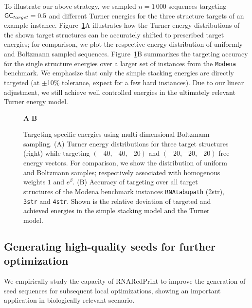 \documentclass{bioinfo}
\makeatletter
\newlength{\@aligneps}
\newcommand{\includegraphicstop}[2][]{%
\sbox{\@alignepsbox}{\texttt{[image: \#2]}}%
\setlength{\@aligneps}{-\ht\@alignepsbox}%
\addtolength{\@aligneps}{2ex}%
\raisebox{\@aligneps}{\usebox{\@alignepsbox}}}
\newcommand{\Software}[1]{{\ttfamily #1}}
\newcommand{\ourprog}{\Software{RNARedPrint}}
\makeatother
\begin{document}
To illustrate our above strategy, we sampled $n=1\,000$ sequences
targeting ${\sf GC}_{target}=0.5$ and different Turner energies for
the three structure targets of an example
instance. Figure~\ref{fig:energydist}A illustrates how the Turner
energy distributions of the shown target structures can be accurately
shifted to prescribed target energies; for comparison, we plot the
respective energy distribution of uniformly and Boltzmann sampled
sequences. Figure~\ref{fig:energydist}B summarizes the targeting accuracy for the single structure energies over a larger set of instances
from the \texttt{Modena} benchmark. We emphasize that only the simple stacking energies
are directly targeted (at $\pm$10\% tolerance, expect for a few hard
instances). Due to our linear adjustment, we still achieve well
controlled energies in the ultimately relevant Turner energy model.
\begin{figure}[t]
  \begin{center}
    {\sf \bfseries A}\includegraphicstop[width=0.57\textwidth]{Figs/energy_distribution}
    {\sf \bfseries B}\includegraphicstop[width=0.32\textwidth]{Figs/offset}
  \end{center}
  \caption{%
  	Targeting specific energies using multi-dimensional Boltzmann sampling. (A) Turner energy distributions for three target structures (right) while targeting $(-40,-40,-20)$ and $(-20,-20,-20)$ free energy vectors. For comparison, we show the distribution of uniform and Boltzmann samples; respectively associated with homogenous weights $1$ and $e^\beta$. (B) Accuracy of targeting over all target structures of the \Software{Modena} benchmark instances \texttt{RNAtabupath} (2str), \texttt{3str} and \texttt{4str}. Shown is the relative deviation of targeted and achieved energies in the simple stacking model and the Turner model.
}
  \label{fig:energydist}
\end{figure}
\subsection{Generating high-quality seeds for further optimization}
We empirically study the capacity of \ourprog{} to improve the generation of seed sequences for subsequent local optimizations, showing an important application in biologically relevant scenario.
\end{document}
